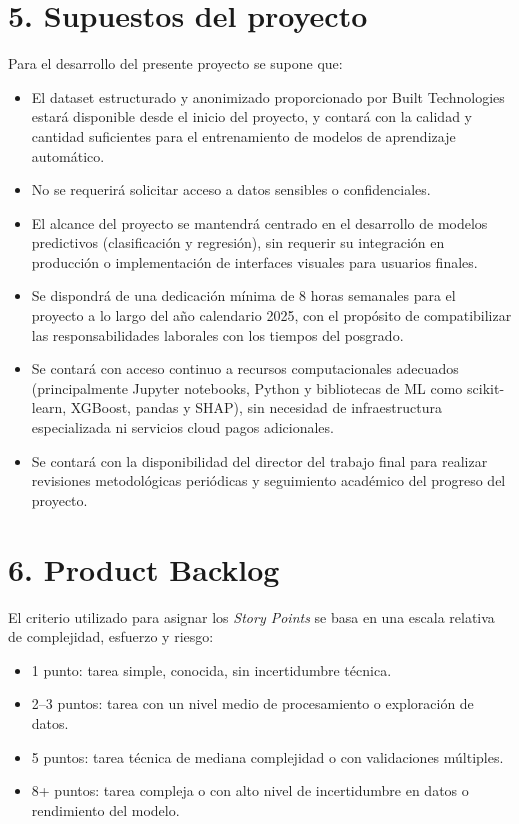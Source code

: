 \documentclass[
11pt, %
]{charter}
\begin{document}
\section{5. Supuestos del proyecto}
\label{sec:supuestos}


Para el desarrollo del presente proyecto se supone que:

\begin{itemize}
    \item El dataset estructurado y anonimizado proporcionado por Built Technologies estará disponible desde el inicio del proyecto, y contará con la calidad y cantidad suficientes para el entrenamiento de modelos de aprendizaje automático.
    \item No se requerirá solicitar acceso a datos sensibles o confidenciales.
    \item El alcance del proyecto se mantendrá centrado en el desarrollo de modelos predictivos (clasificación y regresión), sin requerir su integración en producción o implementación de interfaces visuales para usuarios finales.
    \item Se dispondrá de una dedicación mínima de 8 horas semanales para el proyecto a lo largo del año calendario 2025, con el propósito de compatibilizar las responsabilidades laborales con los tiempos del posgrado.
    \item Se contará con acceso continuo a recursos computacionales adecuados (principalmente Jupyter notebooks, Python y bibliotecas de ML como scikit-learn, XGBoost, pandas y SHAP), sin necesidad de infraestructura especializada ni servicios cloud pagos adicionales.
    \item Se contará con la disponibilidad del director del trabajo final para realizar revisiones metodológicas periódicas y seguimiento académico del progreso del proyecto.
\end{itemize}

\section{6. Product Backlog}
\label{sec:backlog}

El criterio utilizado para asignar los \textit{Story Points} se basa en una escala relativa de complejidad, esfuerzo y riesgo:
\begin{itemize}
  \item 1 punto: tarea simple, conocida, sin incertidumbre técnica.
  \item 2–3 puntos: tarea con un nivel medio de procesamiento o exploración de datos.
  \item 5 puntos: tarea técnica de mediana complejidad o con validaciones múltiples.
  \item 8+ puntos: tarea compleja o con alto nivel de incertidumbre en datos o rendimiento del modelo.
\end{itemize}
\end{document}
